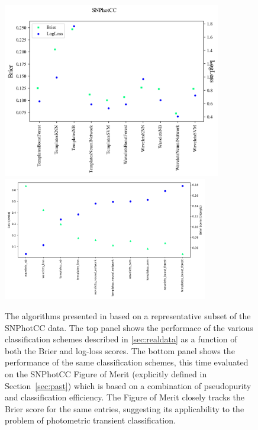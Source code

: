 \begin{figure}
	\begin{center}
		\includegraphics[width=0.85\textwidth]{./fig/SNPhotCC_res.png}\\
		 \includegraphics[width=0.8\textwidth]{./fig/fom_vs_brier.png}
		\caption{The algorithms presented in \cite{lochner_photometric_2016} based on a representative subset of the SNPhotCC data.
		The top panel shows the performace of the various classification schemes described in \ref{sec:realdata} as a function of both the Brier and log-loss scores.
		The bottom panel shows the performance of the same classification schemes, this time evaluated on the SNPhotCC Figure of Merit (explicitly defined in Section~\ref{sec:past}) which is based on a combination of pseudopurity and classification efficiency.
		The Figure of Merit closely tracks the Brier score for the same entries, suggesting its applicability to the problem of photometric transient classification.
		\label{fig:real_metric_compare}}
	\end{center}
\end{figure}

